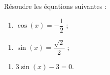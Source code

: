 \documentclass[a4paper,11pt]{article}
\begin{document}
\medskip

\exonum{}

\medskip

Résoudre les équations suivantes :

\begin{enumerate}
	\item $\cos(x)=-\dfrac12$ ;
\end{enumerate}
\begin{enumerate}[resume]
	\item $\sin(x)=\dfrac{\sqrt{2}}{2}$ ;
\end{enumerate}
\begin{enumerate}[resume]
	\item $3\sin(x)-3=0$.
\end{enumerate}
\end{document}
